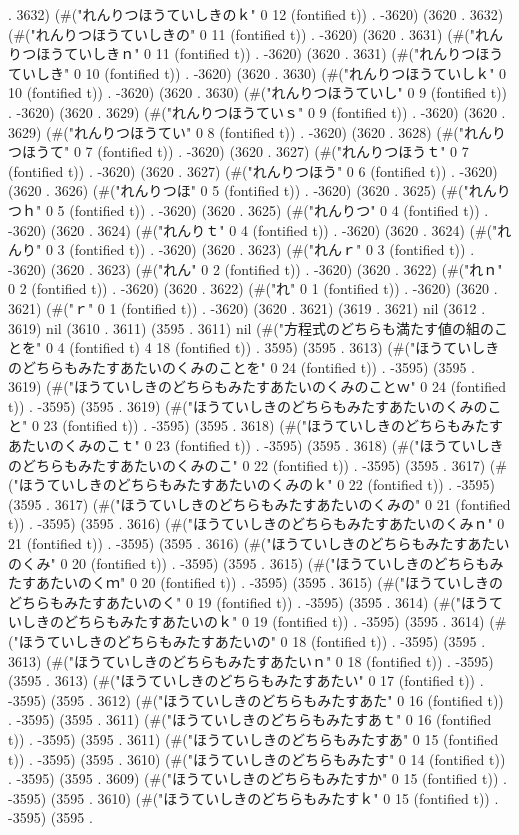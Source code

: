 . 3632) (#("れんりつほうていしきのｋ" 0 12 (fontified t)) . -3620) (3620 . 3632) (#("れんりつほうていしきの" 0 11 (fontified t)) . -3620) (3620 . 3631) (#("れんりつほうていしきｎ" 0 11 (fontified t)) . -3620) (3620 . 3631) (#("れんりつほうていしき" 0 10 (fontified t)) . -3620) (3620 . 3630) (#("れんりつほうていしｋ" 0 10 (fontified t)) . -3620) (3620 . 3630) (#("れんりつほうていし" 0 9 (fontified t)) . -3620) (3620 . 3629) (#("れんりつほうていｓ" 0 9 (fontified t)) . -3620) (3620 . 3629) (#("れんりつほうてい" 0 8 (fontified t)) . -3620) (3620 . 3628) (#("れんりつほうて" 0 7 (fontified t)) . -3620) (3620 . 3627) (#("れんりつほうｔ" 0 7 (fontified t)) . -3620) (3620 . 3627) (#("れんりつほう" 0 6 (fontified t)) . -3620) (3620 . 3626) (#("れんりつほ" 0 5 (fontified t)) . -3620) (3620 . 3625) (#("れんりつｈ" 0 5 (fontified t)) . -3620) (3620 . 3625) (#("れんりつ" 0 4 (fontified t)) . -3620) (3620 . 3624) (#("れんりｔ" 0 4 (fontified t)) . -3620) (3620 . 3624) (#("れんり" 0 3 (fontified t)) . -3620) (3620 . 3623) (#("れんｒ" 0 3 (fontified t)) . -3620) (3620 . 3623) (#("れん" 0 2 (fontified t)) . -3620) (3620 . 3622) (#("れｎ" 0 2 (fontified t)) . -3620) (3620 . 3622) (#("れ" 0 1 (fontified t)) . -3620) (3620 . 3621) (#("ｒ" 0 1 (fontified t)) . -3620) (3620 . 3621) (3619 . 3621) nil (3612 . 3619) nil (3610 . 3611) (3595 . 3611) nil (#("方程式のどちらも満たす値の組のことを" 0 4 (fontified t) 4 18 (fontified t)) . 3595) (3595 . 3613) (#("ほうていしきのどちらもみたすあたいのくみのことを" 0 24 (fontified t)) . -3595) (3595 . 3619) (#("ほうていしきのどちらもみたすあたいのくみのことｗ" 0 24 (fontified t)) . -3595) (3595 . 3619) (#("ほうていしきのどちらもみたすあたいのくみのこと" 0 23 (fontified t)) . -3595) (3595 . 3618) (#("ほうていしきのどちらもみたすあたいのくみのこｔ" 0 23 (fontified t)) . -3595) (3595 . 3618) (#("ほうていしきのどちらもみたすあたいのくみのこ" 0 22 (fontified t)) . -3595) (3595 . 3617) (#("ほうていしきのどちらもみたすあたいのくみのｋ" 0 22 (fontified t)) . -3595) (3595 . 3617) (#("ほうていしきのどちらもみたすあたいのくみの" 0 21 (fontified t)) . -3595) (3595 . 3616) (#("ほうていしきのどちらもみたすあたいのくみｎ" 0 21 (fontified t)) . -3595) (3595 . 3616) (#("ほうていしきのどちらもみたすあたいのくみ" 0 20 (fontified t)) . -3595) (3595 . 3615) (#("ほうていしきのどちらもみたすあたいのくｍ" 0 20 (fontified t)) . -3595) (3595 . 3615) (#("ほうていしきのどちらもみたすあたいのく" 0 19 (fontified t)) . -3595) (3595 . 3614) (#("ほうていしきのどちらもみたすあたいのｋ" 0 19 (fontified t)) . -3595) (3595 . 3614) (#("ほうていしきのどちらもみたすあたいの" 0 18 (fontified t)) . -3595) (3595 . 3613) (#("ほうていしきのどちらもみたすあたいｎ" 0 18 (fontified t)) . -3595) (3595 . 3613) (#("ほうていしきのどちらもみたすあたい" 0 17 (fontified t)) . -3595) (3595 . 3612) (#("ほうていしきのどちらもみたすあた" 0 16 (fontified t)) . -3595) (3595 . 3611) (#("ほうていしきのどちらもみたすあｔ" 0 16 (fontified t)) . -3595) (3595 . 3611) (#("ほうていしきのどちらもみたすあ" 0 15 (fontified t)) . -3595) (3595 . 3610) (#("ほうていしきのどちらもみたす" 0 14 (fontified t)) . -3595) (3595 . 3609) (#("ほうていしきのどちらもみたすか" 0 15 (fontified t)) . -3595) (3595 . 3610) (#("ほうていしきのどちらもみたすｋ" 0 15 (fontified t)) . -3595) (3595 . 